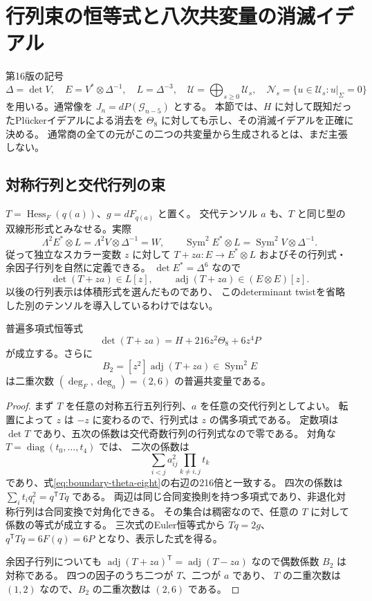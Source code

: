 \section{行列束の恒等式と八次共変量の消滅イデアル}
\label{sec:v17-theta-annihilator}

第16版の記号
\[
 \Delta=\det V,\quad E=V^*\otimes\Delta^{-1},\quad
 L=\Delta^{-3},\quad
 \mathcal U=\bigoplus_{s\ge0}\mathcal U_s,\quad
 \mathcal N_s=\{u\in\mathcal U_s:u|_{\Sigma}=0\}
\]
を用いる。通常像を $J_n=dP(\mathcal G_{n-5})$ とする。
本節では、$H$ に対して既知だったPl\"uckerイデアルによる消去を
$\Theta_8$ に対しても示し、その消滅イデアルを正確に決める。
通常商の全ての元がこの二つの共変量から生成されるとは、まだ主張しない。

\subsection{対称行列と交代行列の束}

$T=\operatorname{Hess}_F(q(a))$、$g=dF_{q(a)}$ と置く。
交代テンソル $a$ も、$T$ と同じ型の双線形形式とみなせる。実際
\[
 \Lambda^2E^*\otimes L=\Lambda^2V\otimes\Delta^{-1}=W,
 \qquad
 \operatorname{Sym}^2E^*\otimes L=\operatorname{Sym}^2V\otimes\Delta^{-1}.
\]
従って独立なスカラー変数 $z$ に対して $T+za:E\to E^*\otimes L$
およびその行列式・余因子行列を自然に定義できる。
$\det E^*=\Delta^6$ なので
\[
 \det(T+za)\in L[z],\qquad
 \operatorname{adj}(T+za)\in(E\otimes E)[z].
\]
以後の行列表示は体積形式を選んだものであり、
このdeterminant twistを省略した別のテンソルを導入しているわけではない。

\begin{lemma}[行列束の三つの係数]
\label{lem:v17-matrix-pencil-coefficients}
普遍多項式恒等式
\begin{equation}\label{eq:v17-determinant-pencil}
 \det(T+za)=H+216z^2\Theta_8+6z^4P
\end{equation}
が成立する。さらに
\[
 B_2=[z^2]\operatorname{adj}(T+za)
 \in\operatorname{Sym}^2E
\]
は二重次数 $(\deg_F,\deg_a)=(2,6)$ の普遍共変量である。
\end{lemma}

\begin{proof}
まず $T$ を任意の対称五行五列行列、$a$ を任意の交代行列としてよい。
転置によって $z$ は $-z$ に変わるので、行列式は $z$ の偶多項式である。
定数項は $\det T$ であり、五次の係数は交代奇数行列の行列式なので零である。
対角な $T=\operatorname{diag}(t_0,\ldots,t_4)$ では、
二次の係数は
\[
 \sum_{i<j}a_{ij}^2\prod_{k\ne i,j}t_k
\]
であり、式\eqref{eq:boundary-theta-eight}の右辺の216倍と一致する。
四次の係数は $\sum_i t_iq_i^2=q^{\mathsf T}Tq$ である。
両辺は同じ合同変換則を持つ多項式であり、非退化対称行列は合同変換で対角化できる。
その集合は稠密なので、任意の $T$ に対して係数の等式が成立する。
三次式のEuler恒等式から $Tq=2g$、
$q^{\mathsf T}Tq=6F(q)=6P$ となり、表示した式を得る。

余因子行列についても
$\operatorname{adj}(T+za)^{\mathsf T}=\operatorname{adj}(T-za)$
なので偶数係数 $B_2$ は対称である。
四つの因子のうち二つが $T$、二つが $a$ であり、
$T$ の二重次数は $(1,2)$ なので、$B_2$ の二重次数は $(2,6)$ である。
\end{proof}

